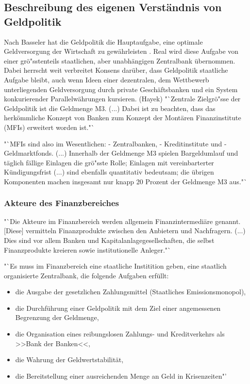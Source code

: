 \documentclass[
      onecolumn,
      a4paper,
      abstracton,
      parskip=half
      ,final
      ]{scrartcl}
\begin{document}
\subsection{Beschreibung des eigenen Verst{\"a}ndnis von Geldpolitik}

Nach Basseler hat die Geldpolitik die Hauptaufgabe, eine optimale Geldversorgung der Wirtschaft zu gew{\"a}hrleisten \citep[Vgl.][S. 551]{Basseler2010}.
Real wird diese Aufgabe von einer gr{\"o}{"ss}tenteils staatlichen, aber unabh{\"a}ngigen Zentralbank {\"u}bernommen. Dabei herrscht weit verbreitet Konsens dar{\"u}ber, dass Geldpolitik staatliche Aufgabe bleibt, auch wenn Ideen einer dezentralen, dem Wettbewerb unterliegenden Geldversorgung durch private Gesch{\"a}ftsbanken und ein System konkurierender Parallelw{\"a}hrungen kursieren. (Hayek)
"`Zentrale Zielgr{\"o}{"ss}e der Geldpolitik ist die Geldmenge M3. (...) Dabei ist zu beachten, dass das herk{\"o}mmliche Konzept von Banken zum Konzept der Mont{\"a}ren Finanzinstitute (MFIs) erweitert worden ist."`
\citep[vgl.][S. 507]{Basseler2010}

\citep[vgl.][S.508]{Basseler2010} "`MFIs sind also im Wesentlichen:
- Zentralbanken,
- Kreditinstitute und
- Geldmarktfonds.
(...) Innerhalb der Geldmenge M3 spielen Bargeldumlauf und t{\"a}glich f{\"a}llige Einlagen die gr{\"o}{"ss}te Rolle; Einlagen mit vereinbarterter K{\"u}ndigungsfrist (...) sind ebenfalls quantitativ bedeutsam; die {\"u}brigen Komponenten machen insgesamt nur knapp 20 Prozent der Geldmenge M3 aus."`


\subsubsection{ Akteure des Finanzbereiches}

\citep[vgl.][S.511f]{Basseler2010} "`Die Akteure im Finanzbereich werden allgemein Finanzintermedi{\"a}re genannt. [Diese] vermitteln Finanzprodukte zwischen den Anbietern und Nachfragern. (...) Dies sind vor allem Banken und Kapitalanlagegesellschaften, die selbst Finanzprodukte kreieren sowie institutionelle Anleger."`

 "`Es muss im Finanzbereich eine staatliche Institition geben, eine staatlich organisierte Zentralbank, die folgende Aufgaben erf{\"u}llt:
 \begin{itemize}
\item{die Ausgabe der gesetzlichen Zahlungsmittel (Staatliches Emissionsmonopol),}
\item{die Durchf{\"u}hrung einer Geldpolitik mit dem Ziel einer angemessenen Begrenzung der Geldmenge,}
\item{die Organisation eines reibungslosen Zahlungs- und Kreditverkehrs als >>Bank der Banken<<,}
\item{die Wahrung der Geldwertstabilit{\"a}t,}
\item{die Bereitstellung einer ausreichenden Menge an Geld in Krisenzeiten"'}
\end{itemize}
\end{document}
